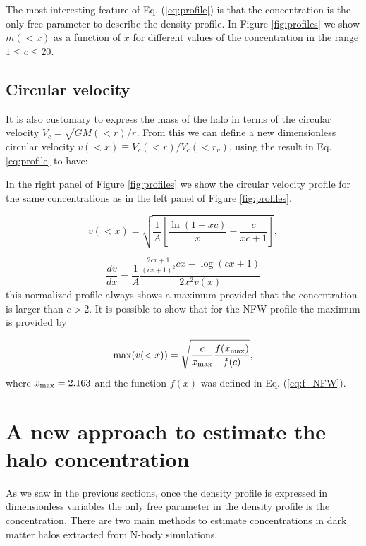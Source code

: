 \documentclass{emulateapj}
\begin{document}
The most interesting feature of Eq. (\ref{eq:profile}) is that the
concentration is the only free parameter to describe the density
profile. In Figure \ref{fig:profiles} we show $m(<x)$ as
a function of $x$ for different values of the concentration in the range
$1\leq c \leq 20$.


\subsection{Circular velocity}

It is also customary to express the mass of the halo in terms of the
circular velocity $V_{c}=\sqrt{GM(<r)/r}$. From this we can
define a new dimensionless circular velocity $v(<x)\equiv
V_{c}(<r)/V_{c}(<r_v)$, using the result in Eq. \ref{eq:profile}
to have:


In the right panel of Figure \ref{fig:profiles} we show the circular
velocity profile for the same concentrations as in the left panel of
Figure \ref{fig:profiles}.

\begin{equation}
v(<x)=\sqrt{\frac{1}{A}\left[\frac{\ln\left(1+xc\right)}{x}-\frac{c}{xc+1}\right]},
\end{equation}

\begin{equation}
\frac{dv}{dx}=\frac{1}{A}\frac{\frac{2cx+1}{\left(cx+1\right)^{2}}cx-\log\left(cx+1\right)}{2x^{2}v\left(x\right)}
\end{equation}
%
this normalized profile always shows a maximum provided that the
concentration is larger than $c>2$.
It is possible to show that for the NFW profile the maximum is
provided by

\begin{equation}
\mathrm{max}(v(<x)) = \sqrt{\frac{c}{x_{\rm max}}\frac{f(x_{\rm
      max})}{f(c)}},
\label{eq:max_v}
\end{equation}
where $x_{\rm max}=2.163$ \citep{Klypin2014} and the function $f(x)$
was defined in Eq. (\ref{eq:f_NFW}).

\section{A new approach to estimate the halo concentration}
\label{sec:method}

As we saw in the previous sections, once the density profile is
expressed in dimensionless variables the only free parameter in the
density profile  is the concentration. There are two main methods to
estimate concentrations in dark matter halos extracted from N-body
simulations.
\end{document}
